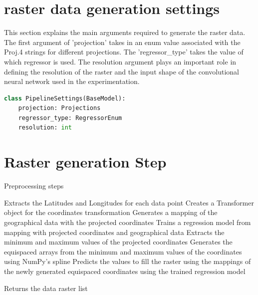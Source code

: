 \section{raster data generation settings}
This section explains the main arguments required to generate the raster data. The first argument of 'projection' takes in an enum value associated with the Proj.4 strings for different projections. The 'regressor\_type' takes the value of which regressor is used. The resolution argument plays an important role in defining the resolution of the raster and the input shape of the convolutional neural network used in the experimentation.
\begin{lstlisting}[language=Python, caption=Pipeline raster data settings]
class PipelineSettings(BaseModel):
    projection: Projections
    regressor_type: RegressorEnum
    resolution: int 
\end{lstlisting}

\section{Raster generation Step}
\begin{algorithm}
    \caption{Preprocessing steps}
    \label{}
    \begin{algorithmic}[1]
        \STATE Extracts the Latitudes and Longitudes for each data point
        \STATE Creates a Transformer object for the coordinates transformation
        \STATE Generates a mapping of the geographical data with the projected coordinates
        \STATE Trains a regression model from mapping with projected coordinates and geographical data
        \STATE Extracts the minimum and maximum values of the projected coordinates
        \STATE Generates the equispaced arrays from the minimum and maximum values of the coordinates using NumPy's spline
        \STATE Predicts the values to fill the raster using the mappings of the newly generated equispaced coordinates  using the trained regression model

        \ENDFOR
        \STATE Returns the data raster list
    \end{algorithmic}
\end{algorithm}